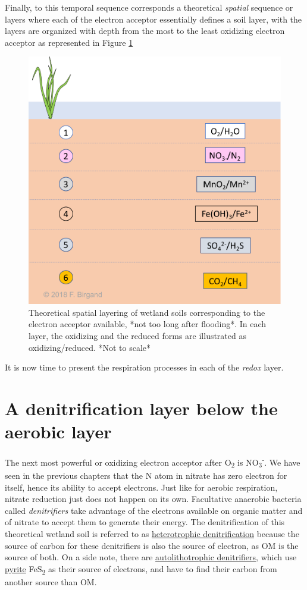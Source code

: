 \documentclass[]{book}
\theoremstyle{definition}
\theoremstyle{definition}
\theoremstyle{definition}
\theoremstyle{remark}
\begin{document}
Finally, to this temporal sequence corresponds a theoretical
\emph{spatial} sequence or layers where each of the electron acceptor
essentially defines a soil layer, with the layers are organized with
depth from the most to the least oxidizing electron acceptor as
represented in Figure \ref{fig:wetland-soil-layers}

\begin{figure}

{\centering \includegraphics[width=0.55\linewidth]{pictures/wetland-soil-layers} 

}

\caption{Theoretical spatial layering of wetland soils corresponding to the electron acceptor available, *not too long after flooding*. In each layer, the oxidizing and the reduced forms are illustrated as oxidizing/reduced. *Not to scale*}\label{fig:wetland-soil-layers}
\end{figure}

It is now time to present the respiration processes in each of the
\emph{redox} layer.

\hypertarget{denit}{\section{A denitrification layer below the aerobic
layer}\label{denit}}

The next most powerful or oxidizing electron acceptor after
O\textsubscript{2} is NO\textsubscript{3}\textsuperscript{-}. We have
seen in the previous chapters that the N atom in nitrate has zero
electron for itself, hence its ability to accept electrons. Just like
for aerobic respiration, nitrate reduction just does not happen on its
own. Facultative anaerobic bacteria called \emph{denitrifiers} take
advantage of the electrons available on organic matter and of nitrate to
accept them to generate their energy. The denitrification of this
theoretical wetland soil is referred to as
\protect\hyperlink{trophic-names}{heterotrophic denitrification} because
the source of carbon for these denitrifiers is also the source of
electron, as OM is the source of both. On a side note, there are
\protect\hyperlink{trophic-names}{autolithotrophic denitrifiers}, which
use \href{https://en.wikipedia.org/wiki/Pyrite}{pyrite}
FeS\textsubscript{2} as their source of electrons, and have to find
their carbon from another source than OM.
\end{document}
